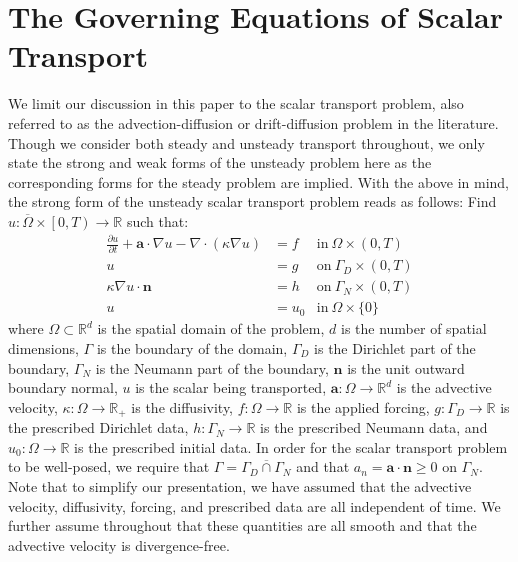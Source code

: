 \documentclass[11pt]{article}
\begin{document}
\section{The Governing Equations of Scalar Transport}
We limit our discussion in this paper to the scalar transport problem, also referred to as the advection-diffusion or drift-diffusion problem in the literature.  Though we consider both steady and unsteady transport throughout, we only state the strong and weak forms of the unsteady problem here as the corresponding forms for the steady problem are implied.  With the above in mind, the strong form of the unsteady scalar transport problem reads as follows: Find $u: \overline{\Omega} \times \left[0,T\right) \rightarrow \mathbb{R}$ such that:
\begin{equation}\label{eq:ad_strong}
\begin{aligned}
\frac{\partial u}{\partial t} + \bm{a} \cdot \nabla u - \nabla \cdot \left( \kappa \nabla u \right)  & = f & \text{in}\ \Omega \times \left(0,T\right) \\
u & = g & \text{on}\ \Gamma_D \times \left(0,T\right) \\
\kappa \nabla u \cdot \bm{n} & = h & \text{on}\ \Gamma_N \times \left(0,T\right) \\
u & = u_0 & \text{in}\ \Omega \times \{0\}
\end{aligned}
\end{equation}
where $\Omega \subset \mathbb{R}^d$ is the spatial domain of the problem, $d$ is the number of spatial dimensions, $\Gamma$ is the boundary of the domain, $\Gamma_D$ is the Dirichlet part of the boundary, $\Gamma_N$ is the Neumann part of the boundary, $\bm{n}$ is the unit outward boundary normal, $u$ is the scalar being transported,  $\bm{a}: \Omega \rightarrow \mathbb{R}^d$ is the advective velocity, $\kappa: \Omega \rightarrow \mathbb{R}_+$ is the diffusivity, $f: \Omega \rightarrow \mathbb{R}$ is the applied forcing, $g: \Gamma_D \rightarrow \mathbb{R}$ is the prescribed Dirichlet data, $h: \Gamma_N \rightarrow \mathbb{R}$ is the prescribed Neumann data, and $u_0 : \Omega \rightarrow \mathbb{R}$ is the prescribed initial data.  In order for the scalar transport problem to be well-posed, we require that $\Gamma = \overline{\Gamma_D \cap \Gamma_N}$ and that $a_n = \bm{a} \cdot \bm{n} \geq 0$ on $\Gamma_N$. Note that to simplify our presentation, we have assumed that the advective velocity, diffusivity, forcing, and prescribed data are all independent of time.  We further assume throughout that these quantities are all smooth and that the advective velocity is divergence-free.
\end{document}
